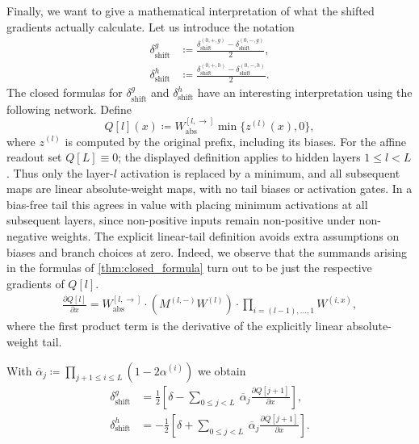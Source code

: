 Finally, we want to give a mathematical interpretation of what the shifted gradients actually calculate. Let us introduce the notation
\begin{align}
    \delta_{\text{shift}}^g
        &\coloneqq \frac{\delta_{\text{shift}}^{(0, +, g)} -\delta_{\text{shift}}^{(0, -, g)}}{2}, \label{eq:stable_def_pos}\\
    \delta_{\text{shift}}^h
        &\coloneqq \frac{\delta_{\text{shift}}^{(0, +, h)} -\delta_{\text{shift}}^{(0, -, h)}}{2}\label{eq:stable_def_neg}.
\end{align}
The closed formulas for $\delta_{\text{shift}}^g$ and $\delta_{\text{shift}}^h$ have an interesting interpretation using the following network.
Define
\[
    Q[l](x) \coloneqq W_{\text{abs}}^{[l,\rightarrow]}
        \min\{z^{(l)}(x),0\},
\]
where $z^{(l)}$ is computed by the original prefix, including its biases.
For the affine readout set $Q[L]\equiv0$; the displayed definition applies to hidden layers $1\leq l<L$. Thus only the layer-$l$ activation is replaced by a minimum, and all subsequent
maps are linear absolute-weight maps, with no tail biases or activation gates.
In a bias-free tail this agrees in value with placing minimum activations at
all subsequent layers, since non-positive inputs remain non-positive under
non-negative weights. The explicit linear-tail definition avoids extra
assumptions on biases and branch choices at zero.
Indeed, we observe that the summands arising in the formulas of \cref{thm:closed_formula} turn out to be just the respective gradients of $Q[l]$.
\begin{align}
    \frac{\partial Q[l]}{\partial x}
        = W_{\text{abs}}^{[l, \rightarrow]} \cdot \left( M^{(l,-)}W^{(l)} \right) \cdot \prod_{i = (l-1),\dots,1} W^{(i,x)} \label{eq:special_network_derivative},
\end{align}
where the first product term is the derivative of the explicitly linear absolute-weight tail.

\begin{theorem} \label{thm:closed_formula_shift}
    With $\overline{\alpha}_j \coloneqq \prod_{j+1 \leq i \leq L} \left( 1 - 2 \alpha^{(i)} \right)$ we obtain
    \begin{align}
        \delta_{\text{shift}}^g &= \frac{1}{2} \left[ \delta - \sum_{0 \leq j < L} \ \overline{\alpha}_j \frac{\partial Q[j+1]}{\partial x} \right], \label{eq:main_shifted_grad_pos}\\
        \delta_{\text{shift}}^h &= - \frac{1}{2} \left[ \delta + \sum_{0 \leq j < L} \ \overline{\alpha}_j  \frac{\partial Q[j+1]}{\partial x} \right]. \label{eq:main_shifted_grad_neg}
    \end{align}
\end{theorem}

